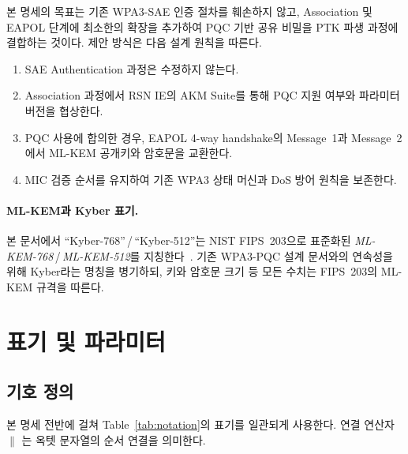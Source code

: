 \documentclass[11pt]{article}
\theoremstyle{definition}
\theoremstyle{plain}
\begin{document}
본 명세의 목표는 기존 WPA3-SAE 인증 절차를 훼손하지 않고, Association 및
EAPOL 단계에 최소한의 확장을 추가하여 PQC 기반 공유 비밀을 PTK 파생 과정에
결합하는 것이다. 제안 방식은 다음 설계 원칙을 따른다.

\begin{enumerate}\itemsep2pt
  \item SAE Authentication 과정은 수정하지 않는다.
  \item Association 과정에서 RSN IE의 AKM Suite를 통해 PQC 지원 여부와
        파라미터 버전을 협상한다.
  \item PQC 사용에 합의한 경우, EAPOL 4-way handshake의 Message~1과 Message~2에서
        ML-KEM 공개키와 암호문을 교환한다.
  \item MIC 검증 순서를 유지하여 기존 WPA3 상태 머신과 DoS 방어 원칙을
        보존한다.
\end{enumerate}

\paragraph{ML-KEM과 Kyber 표기.} 본 문서에서 ``Kyber-768''\,/\,``Kyber-512''는
NIST FIPS~203으로 표준화된 \emph{ML-KEM-768}\,/\,\emph{ML-KEM-512}를
지칭한다~\cite{fips203}. 기존 WPA3-PQC 설계 문서와의 연속성을 위해 Kyber라는
명칭을 병기하되, 키와 암호문 크기 등 모든 수치는 FIPS~203의 ML-KEM 규격을
따른다.

\section{표기 및 파라미터}\label{sec:notation}
\subsection{기호 정의}
본 명세 전반에 걸쳐 Table~\ref{tab:notation}의 표기를 일관되게 사용한다.
연결 연산자 $\|$ 는 옥텟 문자열의 순서 연결을 의미한다.
\end{document}
